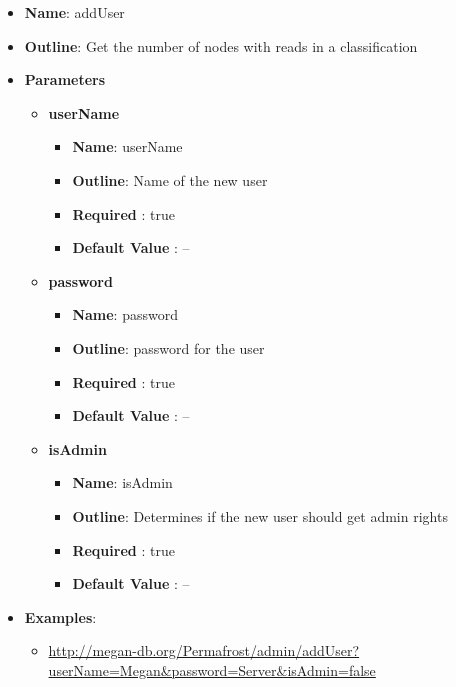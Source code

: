 \documentclass[11pt]{article}
\begin{document}
\begin{itemize}
	\item \textbf{Name}: addUser
	\item \textbf{Outline}: Get the number of nodes with reads in a classification
	\item \textbf{Parameters}
		\begin{itemize}
			\item \textbf{userName}
				\begin{itemize}
					\item \textbf{Name}: userName
					\item \textbf{Outline}: Name of the new user
					\item \textbf{Required} : true
					\item \textbf{Default Value} : --
				\end{itemize}
			\item \textbf{password}
				\begin{itemize}
					\item \textbf{Name}: password
					\item \textbf{Outline}: password for the user
					\item \textbf{Required} : true
					\item \textbf{Default Value} : --
				\end{itemize}
			\item \textbf{isAdmin}
				\begin{itemize}
					\item \textbf{Name}: isAdmin
					\item \textbf{Outline}: Determines if the new user should get admin rights
					\item \textbf{Required} : true
					\item \textbf{Default Value} : --
				\end{itemize}
		\end{itemize}
	\item \textbf{Examples}:
		\begin{itemize}
			\item \url{http://megan-db.org/Permafrost/admin/addUser?userName=Megan&password=Server&isAdmin=false}
		\end{itemize}
\end{itemize}
\end{document}
